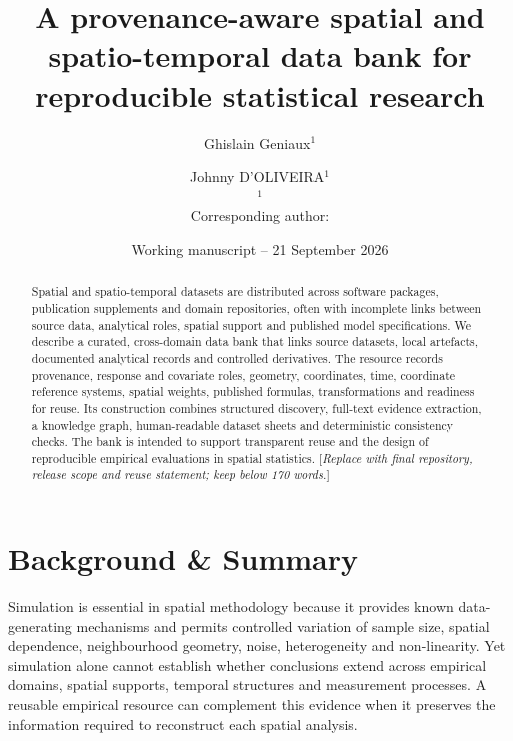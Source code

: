 \documentclass[10pt,a4paper]{article}
\title{\textbf{A provenance-aware spatial and spatio-temporal data bank for reproducible statistical research}}
\author{Ghislain Geniaux$^{1}$ \and Johnny D'OLIVEIRA$^{1}$\\[0.5em]
\small $^{1}$\placeholder{affiliation to confirm}\\
\small Corresponding author: \placeholder{name and email to confirm}}
\date{Working manuscript -- 21 September 2026}
\newcommand{\placeholder}[1]{\textcolor{draftamber}{[\textit{#1}]}}
\begin{document}
\maketitle

\begin{center}
\end{center}

\begin{abstract}
Spatial and spatio-temporal datasets are distributed across software packages,
publication supplements and domain repositories, often with incomplete links
between source data, analytical roles, spatial support and published model
specifications. We describe a curated, cross-domain data bank that links source
datasets, local artefacts, documented analytical records and controlled
derivatives. The resource records provenance, response and covariate roles,
geometry, coordinates, time, coordinate reference systems, spatial weights,
published formulas, transformations and readiness for reuse. Its construction
combines structured discovery, full-text evidence extraction, a knowledge graph,
human-readable dataset sheets and deterministic consistency checks. The bank is
intended to support transparent reuse and the design of reproducible empirical
evaluations in spatial statistics. \placeholder{Replace with final repository,
release scope and reuse statement; keep below 170 words.}
\end{abstract}

\section*{Background \& Summary}

Simulation is essential in spatial methodology because it provides known
data-generating mechanisms and permits controlled variation of sample size,
spatial dependence, neighbourhood geometry, noise, heterogeneity and
non-linearity. Yet simulation alone cannot establish whether conclusions extend
across empirical domains, spatial supports, temporal structures and measurement
processes. A reusable empirical resource can complement this evidence when it
preserves the information required to reconstruct each spatial analysis.
\end{document}

